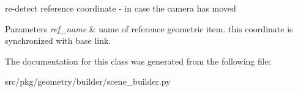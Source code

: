 re-\/detect reference coordinate -\/ in case the camera has moved 


\begin{DoxyParams}{Parameters}
{\em ref\+\_\+name} & name of reference geometric item. this coordinate is synchronized with base link. \\
\hline
\end{DoxyParams}


The documentation for this class was generated from the following file\+:\begin{DoxyCompactItemize}
\item 
src/pkg/geometry/builder/scene\+\_\+builder.\+py\end{DoxyCompactItemize}
